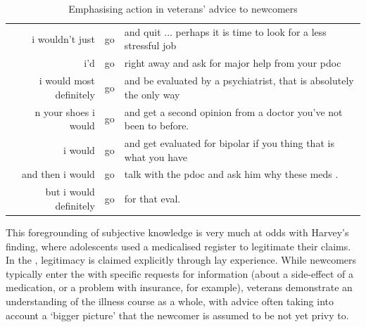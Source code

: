 \begin{table}[htb]
\footnotesize
\begin{tabular}{rrl}

\toprule
        i wouldn't just &  go         &  and quit ... perhaps it is time to look for a less stressful job \\
                                        i'd &  go         &  right away and ask for major help from your pdoc \\
i would most definitely &  go         &  and be evaluated by a psychiatrist, that is absolutely the only way  \\
             n your shoes i would &  go         &  and get a second opinion from a doctor you've not been to before.              \\
                                     i would &  go         &  and get evaluated for bipolar if you thing that is what you have \\
and then i would &  go         &  talk with the pdoc and ask him why these meds .                                  \\
                      but i would definitely &  go         &  for that eval.                                                                  \\
\bottomrule
\end{tabular}
\caption{Emphasising action in veterans' advice to newcomers}
\label{tab:conc_iwould_action}
\end{table}
%
This foregrounding of subjective knowledge is very much at odds with Harvey's \citeyear{harvey_disclosures_2012} finding, where adolescents used a medicalised register to legitimate their claims. In the , legitimacy is claimed explicitly through lay experience. While newcomers typically enter the  with specific requests for information (about a side\hyp{}effect of a medication, or a problem with insurance, for example), veterans demonstrate an understanding of the illness course as a whole, with advice often taking into account a `bigger picture' that the newcomer is assumed to be not yet privy to. 

